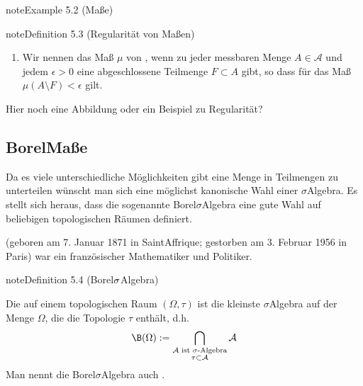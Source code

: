 \documentclass[letterpaper,10pt,english]{jupyterBook}
\begin{document}
\begin{sphinxadmonition}{note}{Example 5.2 (Maße)}
\begin{sphinxadmonition}{note}{Definition 5.3 (Regularität von Maßen)}
\begin{enumerate}
\item {} 
\sphinxAtStartPar
Wir nennen das Maß \(\mu\) von , wenn zu jeder messbaren Menge \(A \in \mathcal{A}\) und jedem \(\epsilon > 0\) eine abgeschlossene Teilmenge \(F \subset A\) gibt, so dass für das Maß \(\mu(A\setminus F) < \epsilon\) gilt.

\end{enumerate}
\end{sphinxadmonition}

\sphinxAtStartPar
Hier noch eine Abbildung oder ein Beispiel zu Regularität?


\subsection{Borel\sphinxhyphen{}Maße}
\label{\detokenize{masstheorie/masstheorie:borel-masze}}
\sphinxAtStartPar
Da es viele unterschiedliche Möglichkeiten gibt eine Menge in Teilmengen zu unterteilen wünscht man sich eine möglichst kanonische Wahl einer \(\sigma\)\sphinxhyphen{}Algebra.
Es stellt sich heraus, dass die sogenannte Borel\sphinxhyphen{}\(\sigma\)\sphinxhyphen{}Algebra eine gute Wahl auf beliebigen topologischen Räumen definiert.

\begin{sphinxShadowBox}
\sphinxstylesidebartitle{}

\sphinxAtStartPar
{} (geboren am 7. Januar 1871 in Saint\sphinxhyphen{}Affrique; gestorben am 3. Februar 1956 in Paris) war ein französischer Mathematiker und Politiker.
\end{sphinxShadowBox}
\label{masstheorie/masstheorie:definition-7}
\begin{sphinxadmonition}{note}{Definition 5.4 (Borel\sphinxhyphen{}\protect\(\sigma\protect\)\sphinxhyphen{}Algebra)}



\sphinxAtStartPar
Die  auf einem topologischen Raum \((\Omega, \tau)\) ist die kleinste \(\sigma\)\sphinxhyphen{}Algebra auf der Menge \(\Omega\), die die Topologie \(\tau\) enthält, d.h.
\begin{equation*}
\begin{split}\B(\Omega) := \bigcap_{\substack{\mathcal{A} \text{ ist $\sigma$-Algebra}\\ \tau \subset \mathcal{A}}} \mathcal{A}\end{split}
\end{equation*}
\sphinxAtStartPar
Man nennt die Borel\sphinxhyphen{}\(\sigma\)\sphinxhyphen{}Algebra auch .
\end{sphinxadmonition}


\end{sphinxadmonition}
\end{document}
